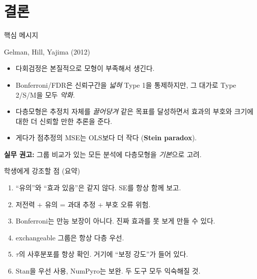 \documentclass[10pt,aspectratio=169]{beamer}
\begin{document}
\section{결론}

\begin{frame}{핵심 메시지}
\begin{block}{Gelman, Hill, Yajima (2012)}
\begin{itemize}
  \item 다회검정은 본질적으로 \alert{모형이 부족해서} 생긴다.
  \item Bonferroni/FDR은 신뢰구간을 \emph{넓혀} Type 1을 통제하지만,
        그 대가로 Type 2/S/M을 모두 \emph{악화}.
  \item 다층모형은 추정치 자체를 \emph{끌어당겨} 같은 목표를 달성하면서
        효과의 부호와 크기에 대한 \alert{더 신뢰할 만한} 추론을 준다.
  \item 게다가 점추정의 MSE는 OLS보다 더 작다 (\textbf{Stein paradox}).
\end{itemize}
\end{block}
\bigskip
\textbf{실무 권고:} 그룹 비교가 있는 모든 분석에 다층모형을 \emph{기본}으로 고려.
\end{frame}

\begin{frame}{학생에게 강조할 점 (요약)}
\begin{enumerate}
  \item \alert{``유의''와 ``효과 있음''은 같지 않다}. SE를 항상 함께 보고.
  \item \alert{저전력 + 유의 = 과대 추정 + 부호 오류 위험}.
  \item \alert{Bonferroni는 만능 보장이 아니다}. 진짜 효과를 못 보게 만들 수 있다.
  \item \alert{exchangeable 그룹은 항상 다층 우선}.
  \item \alert{$\tau$의 사후분포를 항상 확인}. 거기에 ``보정 강도''가 들어 있다.
  \item \alert{Stan을 우선 사용, NumPyro는 보완}. 두 도구 모두 익숙해질 것.
\end{enumerate}
\end{frame}
\end{document}
